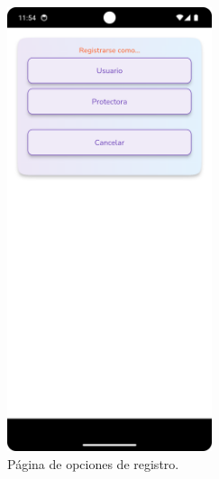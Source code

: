 \documentclass[a4paper, 12pt]{article}
\begin{document}
\begin{figure}[H]
	\begin{center}
		{\includegraphics[width=6cm]{app/Register.png}\par}
		\caption{Página de opciones de registro.}
	\end{center}  
\end{figure}
\end{document}
